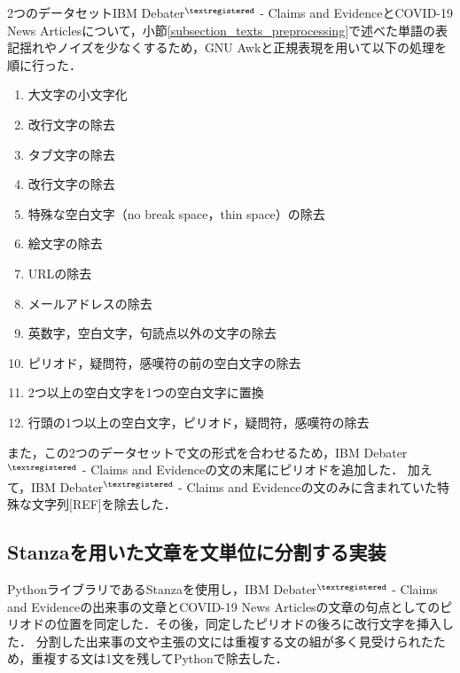 \documentclass[12pt,a4j]{jreport}
\begin{document}
2つのデータセットIBM Debater$^{\textregistered}$ - Claims and EvidenceとCOVID-19 News Articlesについて，小節\ref{subsection_texts_preprocessing}で述べた単語の表記揺れやノイズを少なくするため，GNU Awkと正規表現を用いて以下の処理を順に行った．

\begin{multicols}{2}
  \begin{enumerate}
  \item 大文字の小文字化
  \item 改行文字の除去
  \item タブ文字の除去
  \item 改行文字の除去
  \item 特殊な空白文字（no break space，thin space）の除去
  \item 絵文字の除去
  \columnbreak
  \item URLの除去
  \item メールアドレスの除去
  \item 英数字，空白文字，句読点以外の文字の除去
  \item ピリオド，疑問符，感嘆符の前の空白文字の除去
  \item 2つ以上の空白文字を1つの空白文字に置換
  \item 行頭の1つ以上の空白文字，ピリオド，疑問符，感嘆符の除去
  \end{enumerate}
\end{multicols}

また，この2つのデータセットで文の形式を合わせるため，IBM Debater$^{\textregistered}$ - Claims and Evidenceの文の末尾にピリオドを追加した．
加えて，IBM Debater$^{\textregistered}$ - Claims and Evidenceの文のみに含まれていた特殊な文字列[REF]を除去した．


\subsection{Stanzaを用いた文章を文単位に分割する実装}
PythonライブラリであるStanzaを使用し，IBM Debater$^{\textregistered}$ - Claims and Evidenceの出来事の文章とCOVID-19 News Articlesの文章の句点としてのピリオドの位置を同定した．その後，同定したピリオドの後ろに改行文字を挿入した．
分割した出来事の文や主張の文には重複する文の組が多く見受けられたため，重複する文は1文を残してPythonで除去した．
\end{document}
